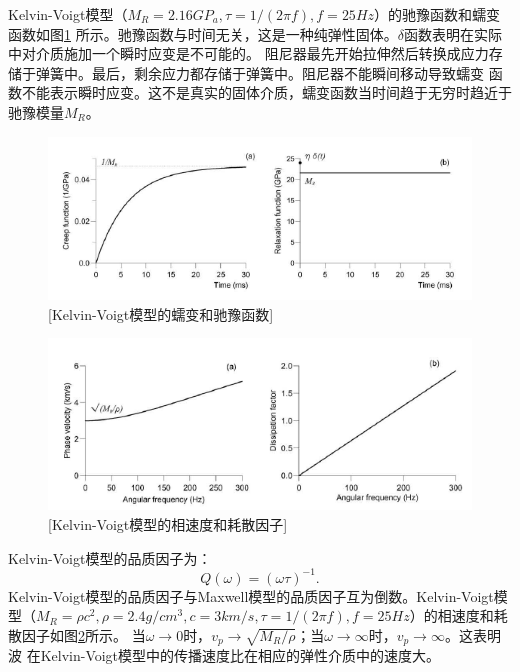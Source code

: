Kelvin-Voigt模型（$M_R=2.16GP_a,\tau=1/(2\pi f),f=25Hz$）的驰豫函数和蠕变函数如图\ref{fig:kelvin_creep}
所示。驰豫函数与时间无关，这是一种纯弹性固体。$\delta$函数表明在实际中对介质施加一个瞬时应变是不可能的。
阻尼器最先开始拉伸然后转换成应力存储于弹簧中。最后，剩余应力都存储于弹簧中。阻尼器不能瞬间移动导致蠕变
函数不能表示瞬时应变。这不是真实的固体介质，蠕变函数当时间趋于无穷时趋近于驰豫模量$M_R$。
\begin{figure}[!htbp]
	    \centering
		\includegraphics[width=0.9\linewidth]{figure/kelvin_creep}
		[Kelvin-Voigt模型的蠕变和驰豫函数]
		\label{fig:kelvin_creep}
\end{figure}
\begin{figure}[!htbp]
	    \centering
		\includegraphics[width=0.8\linewidth]{figure/kelvin_vp}
		[Kelvin-Voigt模型的相速度和耗散因子]
		\label{fig:kelvin_vp}
\end{figure}
Kelvin-Voigt模型的品质因子为：
\begin{equation}
	Q(\omega)=(\omega\tau)^{-1}.
\end{equation}
Kelvin-Voigt模型的品质因子与Maxwell模型的品质因子互为倒数。Kelvin-Voigt模型（$M_R=\rho c^2,
\rho=2.4g/cm^3,c=3km/s,\tau=1/(2\pi f),f=25Hz $）的相速度和耗散因子如图\ref{fig:kelvin_vp}所示。
当$\omega\to0$时，$v_p\to\sqrt{M_R/\rho}$；当$\omega\to\infty$时，$v_p\to\infty$。这表明波
在Kelvin-Voigt模型中的传播速度比在相应的弹性介质中的速度大。


